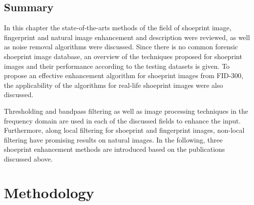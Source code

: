 \documentclass[draft,final]{vutinfth} %
\begin{document}
\section{Summary}
\par
In this chapter the state-of-the-arts methods of the field of shoeprint image, fingerprint and natural image enhancement and description were reviewed, as well as noise removal algorithms were discussed.
Since there is no common forensic shoeprint image database, an overview of the techniques proposed for shoeprint images and their performance according to the testing datasets is given.
To propose an effective enhancement algorithm for shoeprint images from FID-300, the applicability of the algorithms for real-life shoeprint images were also discussed. 
\par
Thresholding and bandpass filtering as well as image processing techniques in the frequency domain are used in each of the discussed fields to enhance the input.
Furthermore, along local filtering for shoeprint and fingerprint images, non-local filtering have promising results on natural images.
In the following, three shoeprint enhancement methods are introduced based on the publications discussed above.

 


\chapter{Methodology}
\end{document}
